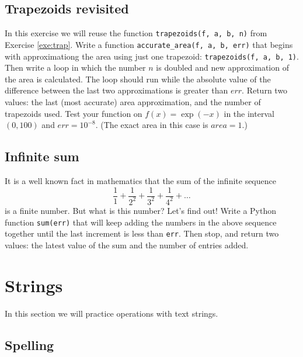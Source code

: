 \subsection{Trapezoids revisited}

In this exercise we will reuse the function {\tt trapezoids(f, a, b, n)}
from Exercise \ref{exe:trap}. Write a function {\tt accurate\_area(f, a, b, err)}
that begins with approximationg the area  using just one trapezoid: 
{\tt trapezoids(f, a, b, 1)}. Then write a loop in which the number 
$n$ is doubled and new approximation of the area is calculated. The loop should 
run while the absolute value of the difference between the last two approximations 
is greater than $err$. Return two values: the last (most accurate) area approximation, 
and the number of trapezoids used. Test your function on $f(x) = \exp(-x)$
in the interval $(0, 100)$ and $err = 10^{-8}$. (The exact area in this case is $area = 1$.)


\subsection{Infinite sum}

It is a well known fact in mathematics that the sum of the infinite sequence 
$$
\frac{1}{1} + \frac{1}{2^2} +\frac{1}{3^2} + \frac{1}{4^2} + \ldots
$$
is a finite number. But what is this number? Let's find out!
Write a Python function {\tt sum(err)} that will keep adding the 
numbers in the above sequence together until the last increment 
is less than {\tt err}. Then stop, and return two values: the latest 
value of the sum and the number of entries added.


\section{Strings}

In this section we will practice operations with text strings.


\subsection{Spelling}

